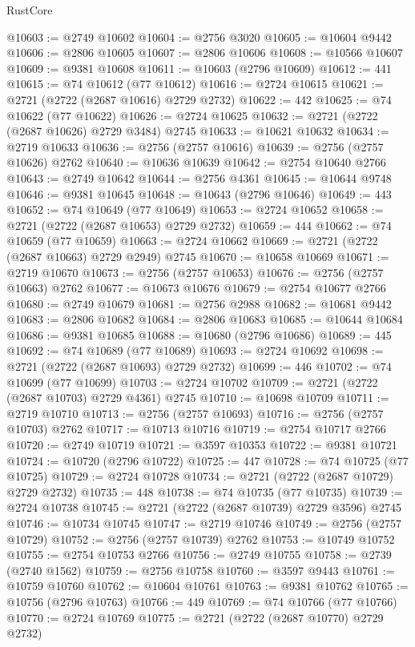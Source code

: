 \begin{lexlean}{RustCore}
\begin{coremodule}
@10603 := @2749 @10602
@10604 := @2756 @3020
@10605 := @10604 @9442
@10606 := @2806 @10605
@10607 := @2806 @10606
@10608 := @10566 @10607
@10609 := @9381 @10608
@10611 := @10603 (@2796 @10609)
@10612 := 441
@10615 := @74 @10612 (@77 @10612)
@10616 := @2724 @10615
@10621 := @2721 (@2722 (@2687 @10616) @2729 @2732)
@10622 := 442
@10625 := @74 @10622 (@77 @10622)
@10626 := @2724 @10625
@10632 := @2721 (@2722 (@2687 @10626) @2729 @3484) @2745
@10633 := @10621 @10632
@10634 := @2719 @10633
@10636 := @2756 (@2757 @10616)
@10639 := @2756 (@2757 @10626) @2762
@10640 := @10636 @10639
@10642 := @2754 @10640 @2766
@10643 := @2749 @10642
@10644 := @2756 @4361
@10645 := @10644 @9748
@10646 := @9381 @10645
@10648 := @10643 (@2796 @10646)
@10649 := 443
@10652 := @74 @10649 (@77 @10649)
@10653 := @2724 @10652
@10658 := @2721 (@2722 (@2687 @10653) @2729 @2732)
@10659 := 444
@10662 := @74 @10659 (@77 @10659)
@10663 := @2724 @10662
@10669 := @2721 (@2722 (@2687 @10663) @2729 @2949) @2745
@10670 := @10658 @10669
@10671 := @2719 @10670
@10673 := @2756 (@2757 @10653)
@10676 := @2756 (@2757 @10663) @2762
@10677 := @10673 @10676
@10679 := @2754 @10677 @2766
@10680 := @2749 @10679
@10681 := @2756 @2988
@10682 := @10681 @9442
@10683 := @2806 @10682
@10684 := @2806 @10683
@10685 := @10644 @10684
@10686 := @9381 @10685
@10688 := @10680 (@2796 @10686)
@10689 := 445
@10692 := @74 @10689 (@77 @10689)
@10693 := @2724 @10692
@10698 := @2721 (@2722 (@2687 @10693) @2729 @2732)
@10699 := 446
@10702 := @74 @10699 (@77 @10699)
@10703 := @2724 @10702
@10709 := @2721 (@2722 (@2687 @10703) @2729 @4361) @2745
@10710 := @10698 @10709
@10711 := @2719 @10710
@10713 := @2756 (@2757 @10693)
@10716 := @2756 (@2757 @10703) @2762
@10717 := @10713 @10716
@10719 := @2754 @10717 @2766
@10720 := @2749 @10719
@10721 := @3597 @10353
@10722 := @9381 @10721
@10724 := @10720 (@2796 @10722)
@10725 := 447
@10728 := @74 @10725 (@77 @10725)
@10729 := @2724 @10728
@10734 := @2721 (@2722 (@2687 @10729) @2729 @2732)
@10735 := 448
@10738 := @74 @10735 (@77 @10735)
@10739 := @2724 @10738
@10745 := @2721 (@2722 (@2687 @10739) @2729 @3596) @2745
@10746 := @10734 @10745
@10747 := @2719 @10746
@10749 := @2756 (@2757 @10729)
@10752 := @2756 (@2757 @10739) @2762
@10753 := @10749 @10752
@10755 := @2754 @10753 @2766
@10756 := @2749 @10755
@10758 := @2739 (@2740 @1562)
@10759 := @2756 @10758
@10760 := @3597 @9443
@10761 := @10759 @10760
@10762 := @10604 @10761
@10763 := @9381 @10762
@10765 := @10756 (@2796 @10763)
@10766 := 449
@10769 := @74 @10766 (@77 @10766)
@10770 := @2724 @10769
@10775 := @2721 (@2722 (@2687 @10770) @2729 @2732)

\end{coremodule}
\end{lexlean}
